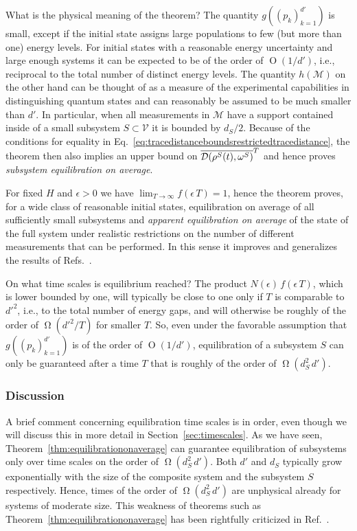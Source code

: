 \documentclass[a4paper,12pt,listof=totoc,index=totoc,bibliography=totoc,headsepline=false,headings=normal,BCOR16.153846mm,DIV12,headinclude,twoside,cleardoublepage=empty,numbers=noenddot,final]{scrreprt}
\theoremstyle{mystyle}
\numberwithin{equation}{section}
\numberwithin{figure}{section}
\numberwithin{lemma}{section}
\numberwithin{theorem}{section}
\numberwithin{corollary}{section}
\numberwithin{definition}{section}
\numberwithin{conjecture}{section}
\numberwithin{observation}{section}
\newcommand{\+}{\mkern2mu}
\newcommand{\texteqref}[1]{Eq.~\eqref{#1}}
\renewcommand{\H}{H}
\newcommand{\Vset}{\mathcal{V}}
\newcommand{\taverage}[2][]{
  \ifthenelse{\equal{#1}{}}
  {\overline{#2}}
  {\overline{#2}^{#1}}
}
\newcommand{\tracedistance}[3][]{
  \ifthenelse{\equal{#2}{}}
  {\ifthenelse{\equal{#3}{}}
    {\mathcal{D}_{#1}}{}
  }{
    \ifthenelse{\equal{#1}{}}
    {\operatorname{\mathcal{D}}(#2,#3)}
    {\operatorname{\mathcal{D}}_{#1}(#2,#3)}
  }
}
\DeclareMathOperator{\landauO}{O}
\DeclareMathOperator{\landauOmega}{\Omega}
\DeclareMathOperator{\1}{\mathds{1}}
\newcommand{\POVMs}{\mathcal{M}}
\begin{document}
What is the physical meaning of the theorem?
The quantity $g((p_k)_{k=1}^{d'})$ is small, except if the initial state assigns large populations to few (but more than one) energy levels.
For initial states with a reasonable energy uncertainty and large enough systems it can be expected to be of the order of $\landauO(1/d')$, i.e., reciprocal to the total number of distinct energy levels.
The quantity $h(\POVMs)$ on the other hand can be thought of as a measure of the experimental capabilities in distinguishing quantum states and can reasonably be assumed to be much smaller than $d'$.
In particular, when all measurements in $\POVMs$ have a support contained inside of a small subsystem $S \subset \Vset$ it is bounded by $d_S/2$.
Because of the conditions for equality in \texteqref{eq:tracedistanceboundsrestrictedtracedistance}, the theorem then also implies an upper bound on $\taverage[T]{\tracedistance{\rho^S(t)}{\omega^S}}$ and hence proves \emph{subsystem equilibration on average}.

For fixed $\H$ and $\epsilon>0$ we have $\lim_{T\to\infty} f(\epsilon\,T) = 1$, hence the theorem proves, for a wide class of reasonable initial states, equilibration on average of all sufficiently small subsystems and \emph{apparent equilibration on average} of the state of the full system under realistic restrictions on the number of different measurements that can be performed.
In this sense it improves and generalizes the results of Refs.~\cite{Reimann08,Linden09}.

On what time scales is equilibrium reached?
The product $N(\epsilon)\,f(\epsilon\,T)$, which is lower bounded by one, will typically be close to one only if $T$ is comparable to ${d'}^2$, i.e., to the total number of energy gaps, and will otherwise be roughly of the order of $\landauOmega({d'}^2/T)$ for smaller $T$.
So, even under the favorable assumption that $g((p_k)_{k=1}^{d'})$ is of the order of $\landauO(1/d')$, equilibration of a subsystem $S$ can only be guaranteed after a time $T$ that is roughly of the order of $\landauOmega(d_S^2\,d')$.


\subsubsection*{Discussion}
%
A brief comment concerning equilibration time scales is in order, even though we will discuss this in more detail in Section~\ref{sec:timescales}.
As we have seen, Theorem~\ref{thm:equilibrationonaverage} can guarantee equilibration of subsystems only over time scales on the order of $\landauOmega(d_S^2\,d')$.
Both $d'$ and $d_S$ typically grow exponentially with the size of the composite system and the subsystem $S$ respectively.
Hence, times of the order of $\landauOmega(d_S^2\,d')$ are unphysical already for systems of moderate size.
This weakness of theorems such as Theorem~\ref{thm:equilibrationonaverage} has been rightfully criticized in Ref.~\cite{1109.4696v1}.
\end{document}
